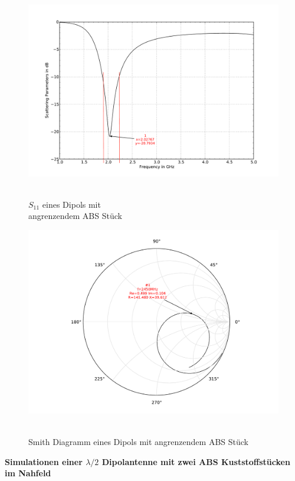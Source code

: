 \begin{figure}[!h]
\begin{center}
  \includegraphics[width=\linewidth]{content/bilder/Evaluation/Dipol/S11DipolABS.pdf}
  \caption{\\$S_{11}$ eines Dipols mit \\angrenzendem ABS Stück}\label{fig:S11_Dipol_ABS_3}
\endminipage%
{}
  \includegraphics[width=\linewidth]{content/bilder/Evaluation/Dipol/SmithDipolABS.pdf}
  \caption{\\Smith Diagramm eines Dipols mit angrenzendem ABS Stück}\label{fig:Smith_Dipol_ABS_4}
\endminipage
\end{center}
\end{figure}

\newpage
\textbf{Simulationen einer $\lambda/2$ Dipolantenne mit zwei ABS Kuststoffstücken im Nahfeld}\\

